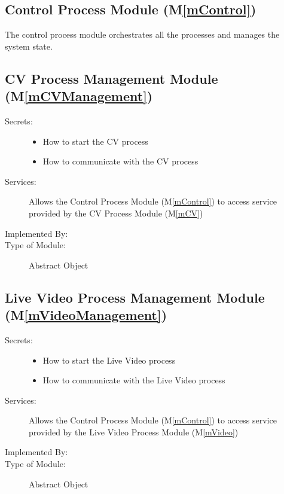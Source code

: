 \documentclass[12pt, titlepage]{article}
\newcommand{\mref}[1]{M\ref{#1}}
\begin{document}
\subsection{Control Process Module (\mref{mControl})}

The control process module orchestrates all the processes and manages the
system state.

\subsection{CV Process Management Module (\mref{mCVManagement})}

\begin{description}
  \item[Secrets:] \leavevmode
        \begin{itemize}
          \item How to start the CV process
          \item How to communicate with the CV process
        \end{itemize}
  \item[Services:] Allows the Control Process Module (\mref{mControl}) to access
        service provided by the CV Process Module (\mref{mCV})
  \item[Implemented By:] \progname
  \item[Type of Module:] Abstract Object
\end{description}

\subsection{Live Video Process Management Module (\mref{mVideoManagement})}

\begin{description}
  \item[Secrets:] \leavevmode
        \begin{itemize}
          \item How to start the Live Video process
          \item How to communicate with the Live Video process
        \end{itemize}
  \item[Services:] Allows the Control Process Module (\mref{mControl}) to access
        service provided by the Live Video Process Module (\mref{mVideo})
  \item[Implemented By:] \progname
  \item[Type of Module:] Abstract Object
\end{description}
\end{document}
